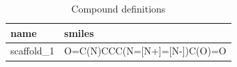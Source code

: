 \begin{table}[htbp]
\centering
\caption{Compound definitions}
\label{tab:table9}
\begin{tabular}{ll}
\toprule
name & smiles \\
\midrule
scaffold\_1 & O=C(N)CCC(N=[N+]=[N-])C(O)=O \\
\bottomrule
\end{tabular}
\end{table}